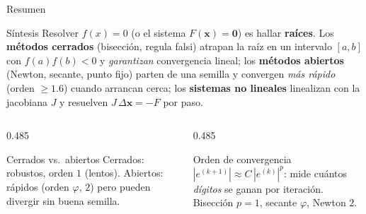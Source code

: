 \documentclass[aspectratio=169,10pt]{beamer}
\begin{document}
\begin{frame}{Resumen}
\begin{cardidea}{Síntesis}{\faLightbulb}
Resolver $f(x)=0$ (o el sistema $F(\mathbf x)=\mathbf 0$) es hallar \textbf{raíces}. Los \textbf{métodos cerrados} (bisección, regula falsi) atrapan la raíz en un intervalo $[a,b]$ con $f(a)f(b)<0$ y \emph{garantizan} convergencia lineal; los \textbf{métodos abiertos} (Newton, secante, punto fijo) parten de una semilla y convergen \emph{más rápido} (orden $\ge 1.6$) cuando arrancan cerca; los \textbf{sistemas no lineales} linealizan con la jacobiana $J$ y resuelven $J\,\Delta\mathbf x=-F$ por paso.
\end{cardidea}
\vspace{2mm}
\begin{columns}[T]
\begin{column}{0.485\textwidth}
\begin{cardgear}{Cerrados vs.\ abiertos}{\faCogs}
Cerrados: robustos, orden $1$ (lentos). Abiertos: rápidos (orden $\varphi$, $2$) pero pueden divergir sin buena semilla.
\end{cardgear}
\end{column}
\begin{column}{0.485\textwidth}
\begin{cardgear}{Orden de convergencia}{\faCogs}
$|e^{(k+1)}|\approx C\,|e^{(k)}|^{p}$: mide cuántos \emph{dígitos} se ganan por iteración. Bisección $p{=}1$, secante $\varphi$, Newton $2$.
\end{cardgear}
\end{column}
\end{columns}
\end{frame}
\end{document}
